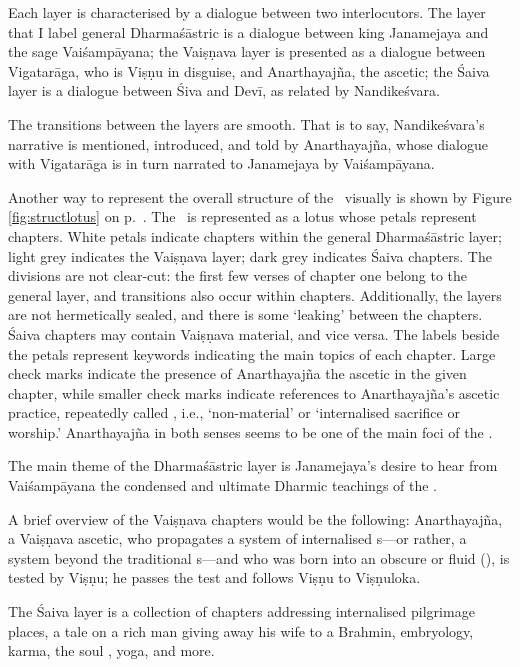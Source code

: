 Each layer is characterised by a dialogue between
two interlocutors. The layer that I label general 
Dharmaśāstric is a dialogue between king Janamejaya and the sage
Vaiśampāyana; the Vaiṣṇava layer is presented as
a dialogue between Vigatarāga, who is
Viṣṇu in disguise, and Anarthayajña,\label{anarthayajna_person} the ascetic;
the Śaiva layer is a dialogue between Śiva and Devī,
as related by Nandikeśvara.

The transitions between the layers are smooth. 
That is to say, Nandikeśvara's narrative
is mentioned, introduced, and told by Anarthayajña, whose dialogue
with Vigatarāga is in turn narrated to Janamejaya by Vai\-śampā\-ya\-na.

Another way to represent the overall structure of the \VSS\
visually is shown by Figure \ref{fig:structlotus} 
on p.~\pageref{fig:structlotus}. 
The \VSS\ is represented
as a lotus whose petals represent chapters. White petals indicate chapters within
the general Dharmaśāstric layer; light grey indicates the Vaiṣṇava layer;
dark grey indicates Śaiva chapters. The divisions are not clear-cut: 
the first few verses of chapter one belong to
the general layer, and transitions also occur within chapters.
Additionally, the layers are not hermetically
sealed, and there is some `leaking' between the chapters.
Śaiva chapters may contain Vaiṣṇava material, and vice versa.
The labels beside the petals represent keywords
indicating the main topics of each chapter.
Large check marks indicate the presence of Anarthayajña the ascetic in
the given chapter, while smaller check marks indicate
references to Anarthayajña's ascetic practice,
repeatedly called , 
i.e., `non-material' or `internali\-sed sacrifice or worship.'\label{nonmaterial}
Anarthayajña in both senses seems to be one of the 
main foci of the \VSS.

The main theme of the Dharmaśāstric layer is Janamejaya's desire 
to hear from Vaiśampāyana the condensed and ultimate Dharmic teachings of the \MBh.

A brief overview of the Vaiṣṇava chapters would be the following:
An\-artha\-yajña, a Vaiṣṇava ascetic, who propagates
a system of internalised s---or rather,
a system beyond the traditional s---and
who was born into an obscure or fluid  
(),
is tested by Viṣṇu; he passes the test
and follows Viṣṇu to Viṣṇuloka.

The Śaiva layer is a collection of chapters addressing internalised
pilgrimage places, a tale on a rich man giving away his wife to a Brahmin,
embryology, karma, the soul \ie{jīva}, yoga, and more.

